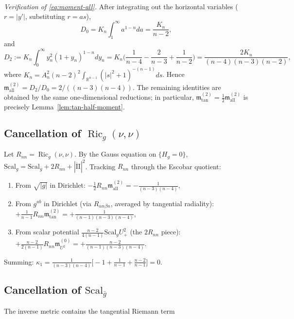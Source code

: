 \documentclass[11pt,reqno,a4paper]{amsart}
\numberwithin{equation}{section}
\theoremstyle{plain}
\newcommand{\Scal}{\mathrm{Scal}}
\theoremstyle{remark}
\theoremstyle{plain}
\begin{document}
\emph{Verification of \eqref{eq:moment-all}.}
After integrating out the horizontal variables ($r=|y'|$, substituting $r = as$),
\[
D_0 = K_n \int_1^\infty a^{1-n}da = \frac{K_n}{n-2},
\]
and
\[
D_2 := K_n \int_0^\infty y_n^2(1+y_n)^{1-n}dy_n
= K_n\Big(\frac{1}{n-4}-\frac{2}{n-3}+\frac{1}{n-2}\Big)
= \frac{2K_n}{(n-4)(n-3)(n-2)},
\]
where $K_n = A_n^2(n-2)^2\int_{\mathbb R^{n-1}}(|s|^2+1)^{-(n-1)}ds$.
Hence $\mathfrak{m}_{\mathrm{all}}^{(2)} = D_2/D_0 = 2/((n-3)(n-4))$.
The remaining identities are obtained by the same one-dimensional reductions; in particular,
$\mathfrak{m}_{\mathrm{tan}}^{(2)}=\frac12\mathfrak{m}_{\mathrm{all}}^{(2)}$ is precisely
Lemma~\ref{lem:tan-half-moment}.

\subsection*{Cancellation of \texorpdfstring{$\operatorname{Ric}_g(\nu,\nu)$}{Ric(nu,nu)}}
Let $R_{nn} = \operatorname{Ric}_g(\nu,\nu)$. By the Gauss equation on $\{H_g=0\}$,
$\Scal_g = \Scal_{\bar g} + 2R_{nn} + |\mathring{\mathrm{II}}|^2$.
Tracking $R_{nn}$ through the Escobar quotient:
\begin{enumerate}
\item From $\sqrt{|g|}$ in Dirichlet:
$-\frac{1}{2} R_{nn}\mathfrak{m}_{\mathrm{all}}^{(2)}
= -\frac{1}{(n-3)(n-4)}$,
\item From $g^{ab}$ in Dirichlet (via $R_{\alpha n\beta n}$, averaged by tangential radiality):
$+\frac{1}{n-1}R_{nn}\mathfrak{m}_{\mathrm{tan}}^{(2)}
= +\frac{1}{(n-1)(n-3)(n-4)}$,
\item From scalar potential $\frac{n-2}{4(n-1)}\Scal_gU_+^2$ (the $2R_{nn}$ piece):
$+\frac{n-2}{2(n-1)}R_{nn}\mathfrak{m}_{U^2}^{(0)}
= +\frac{n-2}{(n-1)(n-3)(n-4)}$.
\end{enumerate}
Summing: $\kappa_1 = \frac{1}{(n-3)(n-4)}\big[-1 + \frac{1}{n-1} + \frac{n-2}{n-1}\big] = 0$.

\subsection*{Cancellation of \texorpdfstring{$\Scal_{\bar g}$}{Scal}}
The inverse metric contains the tangential Riemann term
\end{document}

